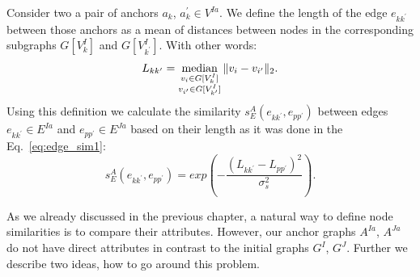 Consider two a pair of anchors  $a_k$, $a_k^\prime\in V^{Ia}$. We define the length of the edge $e_{kk^{\prime}}$ between those anchors as a mean of distances between nodes in the corresponding subgraphs $G[V^I_k]$ and $G[V^I_{k^\prime}]$. With other words:
\begin{equation} L_{kk^\prime} = \mathop{\rm median}_{\substack{v_i\in G[V^I_k]\\ v_{i^\prime}\in G[V^I_{k^\prime}]} }\|v_i-v_{i^\prime}\|_{2}. \end{equation}
Using this definition we calculate the similarity $s^A_E(e_{kk^\prime}, e_{pp^\prime})$ between edges $e_{kk^\prime}\in E^{Ia}$ and $e_{pp^\prime}\in E^{Ja}$ based on their length as it was done in the Eq.~\eqref{eq:edge_sim1}:
\begin{equation*}
s^A_E(e_{kk^\prime}, e_{pp^\prime}) = exp(-\frac{(L_{kk^\prime} - L_{pp^\prime})^2}{\sigma^2_{s}}).
\label{eq:s_e_A}
\end{equation*}

As we already discussed in the previous chapter, a natural way to define node similarities is to compare their attributes. However, our anchor graphs $A^{Ia}$, $A^{Ja}$ do not have direct attributes in contrast to the initial graphs $G^I$, $G^J$. Further we describe two ideas, how to go around this problem. %

